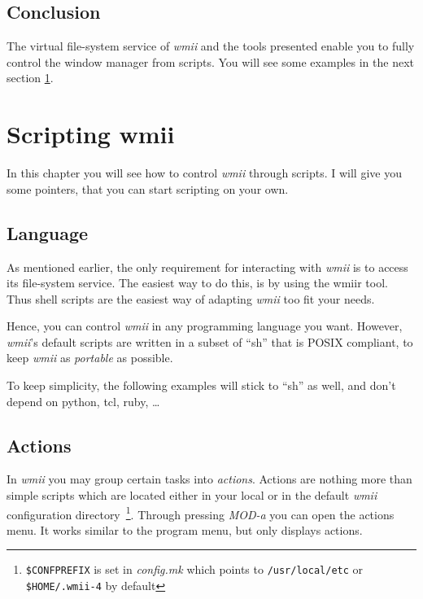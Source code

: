 \documentclass[12pt,a4paper]{article} %
\newcommand{\wmii}{\emph{wmii}}
\begin{document}
    \subsection{Conclusion}

    The virtual file-system service of \wmii{} and the tools presented enable
    you to fully control the window manager from scripts.
    You will see some examples in the next section
    \ref{sec:scripting}.

    \section{Scripting wmii}
    \label{sec:scripting}

    In this chapter you will see how to control \wmii{} through scripts. I will
    give you some pointers, that you can start scripting on your own.

    \subsection{Language}

    As mentioned earlier, the only requirement for interacting with \wmii{} is to
    access its file-system service. The easiest way to do this, is by using
    the wmiir tool. Thus shell scripts are the easiest way of adapting \wmii
    too fit your needs.

    Hence, you can control \wmii{} in any programming language you want. However,
    \wmii's default scripts are written in a subset of ``sh'' that is POSIX
    compliant, to keep \wmii{} as \emph{portable} as possible.
    
    To keep simplicity, the following examples will stick to ``sh'' as well,
    and don't depend on python, tcl, ruby, \dots 


    \subsection{Actions}

    In \wmii{} you may group certain tasks into \emph{actions}. Actions
    are nothing more than simple scripts which are located either in
    your local or in the default \wmii{} configuration
    directory~\footnote{ \texttt{\$CONFPREFIX} is set in
      \emph{config.mk} which points to \texttt{/usr/local/etc}
      or \texttt{\$HOME/.wmii-4} by default}.
    Through pressing \emph{MOD-a} you can open the actions menu. It works
    similar to the program menu, but only displays actions.
\end{document}

